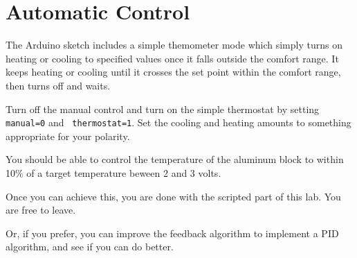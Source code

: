 \documentclass[12pt]{article}
\begin{document}
\section{Automatic Control}

The Arduino sketch includes a simple themometer mode which simply turns on
heating or cooling to specified values once it falls outside the comfort range.
It keeps heating or cooling until it crosses the set point within the comfort
range, then turns off and waits.

Turn off the manual control and turn on the simple thermostat by setting {\tt manual=0} and {\tt
  thermostat=1}.  Set the cooling and heating amounts to something appropriate for your polarity.

You should be able to control the temperature of the aluminum block to within
10\% of a target temperature beween 2 and 3 volts.

Once you can achieve this, you are done with the scripted part of this lab.  You are free to leave.

Or, if you prefer, you can improve the feedback algorithm to implement a PID
algorithm, and see if you can do better.
\end{document}
